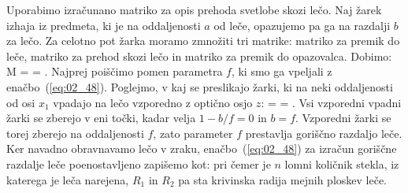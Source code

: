 Uporabimo izračunano matriko za opis prehoda svetlobe skozi lečo. Naj žarek izhaja iz 
predmeta, ki je na oddaljenosti $a$ od leče, opazujemo pa ga na razdalji
$b$ za lečo. Za celotno pot žarka moramo zmnožiti tri matrike: matriko za 
premik do leče, matriko za prehod skozi lečo in matriko za premik do opazovalca.
Dobimo:
\beq
M = 
\left[\begin{array}{cc}
1& b\\
0&1
\end{array}\right]\cdot
{}
\cdot
\left[\begin{array}{cc}
1& a\\
0&1
\end{array}\right]
= 
\!\!.
\label{eq:02_49}
\eeq
Najprej poiščimo pomen parametra $f$, ki smo ga vpeljali z enačbo~(\ref{eq:02_48}).
Poglejmo, v kaj se preslikajo žarki, ki na neki oddaljenosti od osi $x_1$ vpadajo na lečo 
vzporedno z optično osjo $z$:
\beq
{} =
 \cdot
\left[\begin{array}{c}
x_1\\
0
\end{array}\right] = 
\!\!.
\label{eq:02_51}
\eeq
Vsi vzporedni vpadni žarki se zberejo v eni točki, kadar velja $1-b/f = 0$ in $b=f$. 
Vzporedni žarki se torej zberejo na oddaljenosti $f$, zato 
parameter $f$ prestavlja goriščno razdaljo leče. 
Ker navadno obravnavamo lečo v zraku, enačbo~(\ref{eq:02_48}) za izračun 
goriščne razdalje leče poenostavljeno zapišemo  kot:
pri čemer je $n$ lomni količnik stekla, iz katerega je leča narejena, $R_1$ in $R_2$ pa 
sta krivinska radija mejnih ploskev leče.

